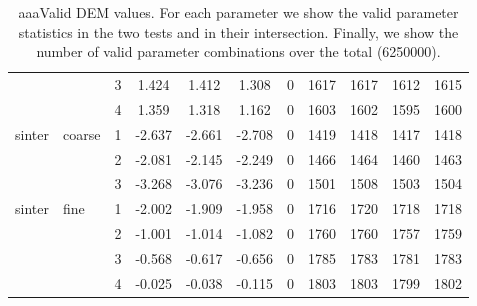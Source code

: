 \begin{table}
\begin{tabular}{ll|c|cccc|cccc}
          &       & 3     & 1.424 & 1.412 & 1.308 & 0     & 1617  & 1617  & 1612  & 1615 \\
          &       & 4     & 1.359 & 1.318 & 1.162 & 0     & 1603  & 1602  & 1595  & 1600 \\
\hline 
    sinter & coarse & 1     & -2.637 & -2.661 & -2.708 & 0     & 1419  & 1418  & 1417  & 1418 \\
          &       & 2     & -2.081 & -2.145 & -2.249 & 0     & 1466  & 1464  & 1460  & 1463 \\
          &       & 3     & -3.268 & -3.076 & -3.236 & 0     & 1501  & 1508  & 1503  & 1504 \\
\hline 
    sinter & fine  & 1     & -2.002 & -1.909 & -1.958 & 0     & 1716  & 1720  & 1718  & 1718 \\
          &       & 2     & -1.001 & -1.014 & -1.082 & 0     & 1760  & 1760  & 1757  & 1759 \\
          &       & 3     & -0.568 & -0.617 & -0.656 & 0     & 1785  & 1783  & 1781  & 1783 \\
          &       & 4     & -0.025 & -0.038 & -0.115 & 0     & 1803  & 1803  & 1799  & 1802 \\
    \hline
\end{tabular}
\caption[aaaValid DEM values]{aaaValid DEM values. For each parameter we show
the valid parameter statistics in the two tests and in their intersection.
Finally, we show the number of valid parameter combinations over the total
(6250000).}
\label{tab:20shearcell1}
\end{table}